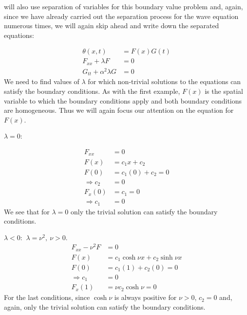  will also use separation of variables for this boundary value problem and, again, since we have already carried out the separation process for the wave equation numerous times, we will again skip ahead and write down the separated equations:

\begin{align*}
\theta(x,t) &= F(x)G(t) \\
F_{xx} + \lambda F &= 0 \\
G_{tt} + \alpha^2 \lambda G &= 0
\end{align*}
We need to find values of $\lambda$ for which non-trivial solutions to the equations can satisfy the boundary conditions.  As with the first example, $F(x)$ is the spatial variable to which the boundary conditions apply and both boundary conditions are homogeneous.  Thus we will again focus our attention on the equation for $F(x)$.

\vspace{0.25cm}

\noindent\underline{$\lambda = 0$}:

\begin{align*}
F_{xx} &= 0 \\
F(x) &= c_1x + c_2 \\
F(0) &= c_1(0) + c_2 = 0 \\
\Rightarrow c_2 &= 0 \\
F_{x}(0) &= c_1 = 0 \\
\Rightarrow c_1 &= 0
\end{align*}
We see that for $\lambda = 0$ only the trivial solution can satisfy the boundary conditions.

\vspace{0.25cm}

\noindent\underline{$\lambda < 0$}: $\ \lambda = \nu^2, \ \nu>0$.
\begin{align*}
F_{xx} - \nu^2 F &= 0 \\
F(x) &= c_1 \cosh{\nu x} + c_2 \sinh{\nu x} \\
F(0) &= c_1(1) + c_2(0) = 0 \\
\Rightarrow c_1 &= 0 \\
F_{x}(1) &= \nu c_2 \cosh{\nu} = 0
\end{align*} 
For the last conditions, since $\cosh{\nu}$ is always positive for $\nu>0$, $c_2 = 0$ and, again, only the trivial solution can satisfy the boundary conditions.


